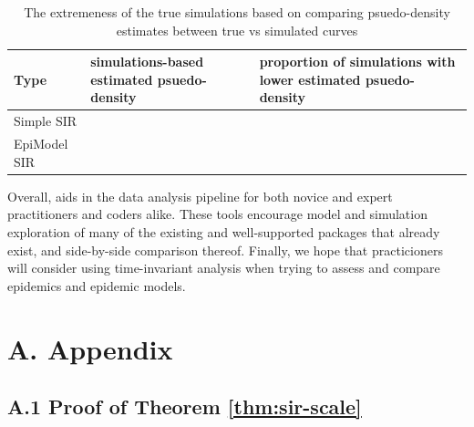 \documentclass[
  shortnames]{jss}
\begin{document}
\begin{CodeChunk}
\begin{table}[!h]

\caption{\label{tab:hags-extreme}The extremeness of the true simulations based on comparing psuedo-density estimates between true vs simulated curves}
\centering
\begin{tabular}[t]{l>{\raggedleft\arraybackslash}p{6cm}>{\raggedleft\arraybackslash}p{6cm}}
\toprule
Type & simulations-based estimated psuedo-density & proportion of simulations with lower estimated psuedo-density\\
\midrule
Simple SIR & 0.0036733 & 0.00\\
EpiModel SIR & 0.0149686 & 0.02\\
\bottomrule
\end{tabular}
\end{table}

\end{CodeChunk}

Overall,  aids in the data analysis pipeline for both
novice and expert practitioners and coders alike. These tools encourage
model and simulation exploration of many of the existing and
well-supported packages that already exist, and side-by-side comparison
thereof. Finally, we hope that practicioners will consider using
time-invariant analysis when trying to assess and compare epidemics and
epidemic models.

\hypertarget{a.-appendix}{%
\section*{A. Appendix}\label{a.-appendix}}

\hypertarget{a.1-proof-of-theorem}{%
\subsection*{\texorpdfstring{A.1 Proof of Theorem
\ref{thm:sir-scale}}{A.1 Proof of Theorem }}\label{a.1-proof-of-theorem}}
\end{document}
